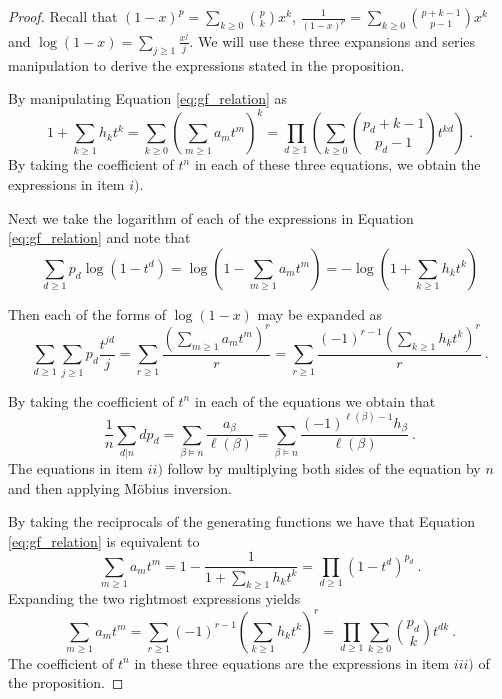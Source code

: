 \documentclass[11pt]{amsart}
\theoremstyle{definition}
\numberwithin{equation}{section}
\begin{document}
\begin{proof}
Recall that $(1-x)^p = \sum_{k \geq 0} \binom{p}{k} x^k$,
$\frac{1}{(1-x)^p} = \sum_{k \geq 0} \binom{p+k-1}{p-1} x^k$
and $\log(1-x) = \sum_{j \geq 1} \frac{x^j}{j}$.
We will use these three expansions and series manipulation
to derive the expressions stated in the proposition.

By manipulating Equation \eqref{eq:gf_relation} as
\begin{equation}\label{eq:gf_relation}
1 + \sum_{k \geq 1} h_k t^k = \sum_{k \geq 0} \left(\sum_{m \geq 1} a_m t^m\right)^k = \prod_{d \geq 1}
\left(\sum_{k \geq 0} \binom{p_d+k-1}{p_d-1} t^{kd}\right)~.
\end{equation}
By taking the coefficient of $t^n$ in each of these three equations, we obtain the expressions in item $i)$.

Next we take the logarithm of each of the expressions in Equation \eqref{eq:gf_relation} and note that
\begin{equation}
\sum_{d \geq 1} p_d \log( 1-t^d )
= \log\left( 1 - \sum_{m \geq 1} a_m t^m \right)
= -\log\left( 1 + \sum_{k \geq 1} h_k t^k \right)
\end{equation}

Then each of the forms of $\log(1 - x)$ may be expanded as
\begin{equation}
\sum_{d \geq 1} \sum_{j \geq 1} p_d \frac{t^{jd}}{j}
= \sum_{r \geq 1} \frac{(\sum_{m \geq 1} a_m t^m )^r}{r}
= \sum_{r \geq 1} \frac{(-1)^{r-1}(\sum_{k \geq 1} h_k t^k )^r}{r}~.
\end{equation}

By taking the coefficient of $t^n$ in each of the equations we obtain that
\begin{equation}
\frac{1}{n}\sum_{d |n} d p_d
= \sum_{\beta \vDash n} \frac{a_\beta}{\ell(\beta)}
= \sum_{\beta \vDash n} \frac{(-1)^{\ell(\beta)-1} h_\beta}{\ell(\beta)}~.
\end{equation}
The equations in item $ii)$ follow by multiplying both sides of the equation by $n$ and then
applying M\"obius inversion.

By taking the reciprocals of the generating functions we have that Equation \eqref{eq:gf_relation} is equivalent to
\begin{equation}
\sum_{m \geq 1} a_m t^m = 1 - \frac{1}{1 + \sum_{k \geq 1} h_k t^k} =  \prod_{d \geq 1} (1-t^d)^{p_d}~.
\end{equation}
Expanding the two rightmost expressions yields
\begin{equation}
\sum_{m \geq 1} a_m t^m
= \sum_{r \geq 1} (-1)^{r-1} \left(\sum_{k \geq 1} h_k t^k\right)^r
= \prod_{d \geq 1} \sum_{k \geq 0} \binom{p_d}{k} t^{dk}~.
\end{equation}
The coefficient of $t^n$ in these three equations are the expressions in item $iii)$ of the proposition.
\end{proof}
\end{document}
